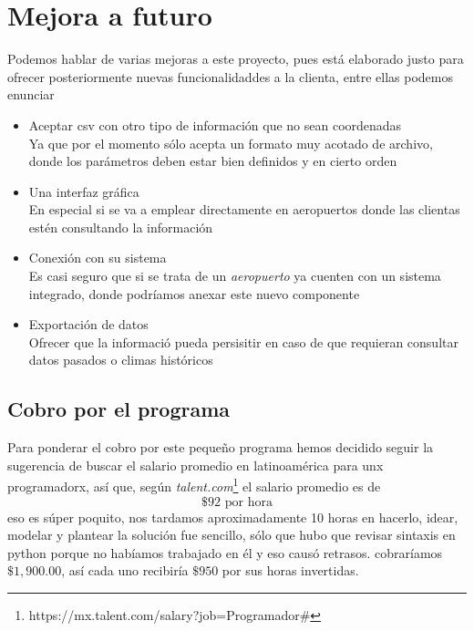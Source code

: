 \documentclass[letterpaper]{article}
\begin{document}
\section{Mejora a futuro}
Podemos hablar de varias mejoras a este proyecto, pues está elaborado justo para ofrecer posteriormente nuevas funcionalidaddes a la clienta, entre ellas podemos enunciar
\begin{itemize}
	\item Aceptar csv con otro tipo de información que no sean coordenadas\\
	Ya que por el momento sólo acepta un formato muy acotado de archivo, donde los parámetros deben estar bien definidos y en cierto orden
	\item Una interfaz gráfica \\
	En especial si se va a emplear directamente en aeropuertos donde las clientas estén consultando la información
	\item Conexión con su sistema\\
	Es casi seguro que si se trata de un \textit{aeropuerto} ya cuenten con un sistema integrado, donde podríamos anexar este nuevo componente
	\item Exportación de datos\\
	Ofrecer que la informació pueda persisitir en caso de que requieran consultar datos pasados o climas históricos
\end{itemize}
\subsection{Cobro por el programa}
Para ponderar el cobro por este pequeño programa hemos decidido seguir la sugerencia de buscar el salario promedio en latinoamérica para unx programadorx, así que, según \textit{talent.com}\footnote{https://mx.talent.com/salary?job=Programador\#} el salario promedio es de 
\[  \$ 92 \text{  por hora} \] 
eso es súper poquito, nos tardamos aproximadamente 10 horas en hacerlo, idear, modelar y plantear la solución fue sencillo, sólo que hubo que revisar sintaxis en python porque no habíamos trabajado en él y eso causó retrasos.
cobraríamos $ \$1,900.00 $, así cada uno recibiría $ \$ 950 $ por sus horas invertidas.
\end{document}
